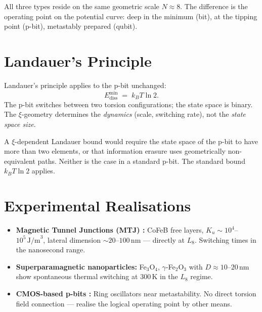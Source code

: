 	All three types reside on the same geometric scale $N \approx 8$.
	The difference is the operating point on the potential curve:
	deep in the minimum (bit), at the tipping point (p-bit), metastably prepared (qubit).
	
	\section{Landauer's Principle}
	\label{sec:landauer}
	
	Landauer's principle \cite{Landauer1961} applies to the p-bit unchanged:
	\begin{equation}
		E_\text{diss}^\text{min} \;=\; k_B T \ln 2.
		\label{eq:landauer}
	\end{equation}
	The p-bit switches between two torsion configurations; the
	state space is binary. The $\xi$-geometry determines the \emph{dynamics}
	(scale, switching rate), not the \emph{state space size}.
	
	\begin{important}
		A $\xi$-dependent Landauer bound would require the
		state space of the p-bit to have more than two elements, or that
		information erasure uses geometrically non-equivalent paths.
		Neither is the case in a standard p-bit.
		The standard bound $k_BT \ln 2$ applies.
	\end{important}
	
	\section{Experimental Realisations}
	\label{sec:experiment}
	
	\begin{itemize}
		\item \textbf{Magnetic Tunnel Junctions (MTJ) \cite{Borders2019}:}
		CoFeB free layers, $K_u \sim 10^4$--$10^5\,\text{J/m}^3$,
		lateral dimension $\sim 20$--$100\,\text{nm}$ --- directly at $L_8$.
		Switching times in the nanosecond range.
		
		\item \textbf{Superparamagnetic nanoparticles:}
		Fe$_3$O$_4$, $\gamma$-Fe$_2$O$_3$ with $D \approx 10$--$20\,\text{nm}$
		show spontaneous thermal switching at 300\,K in the
		$L_8$ regime.
		
		\item \textbf{CMOS-based p-bits \cite{Aadit2022}:}
		Ring oscillators near metastability. No direct
		torsion field connection --- realise the logical operating point
		by other means.
	\end{itemize}
	
